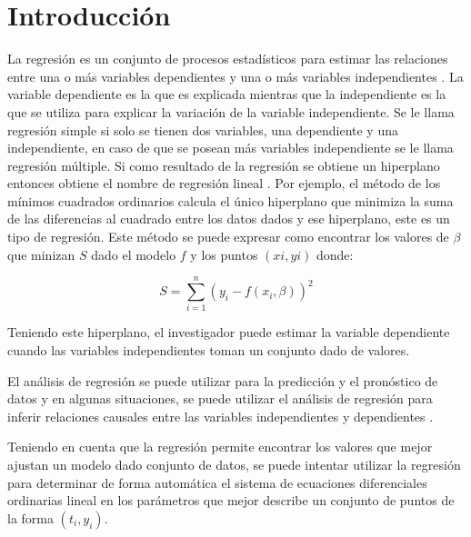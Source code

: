 \chapter*{Introducción}\label{chapter:introduction}

\qquad

La regresión es un conjunto de procesos estadísticos para estimar las relaciones entre una o más variables dependientes y una o más variables independientes \cite{johnson2015applied}. La variable dependiente es la que es explicada mientras que la independiente es la que se utiliza para explicar la variación de la variable independiente. Se le llama regresión simple si solo se tienen dos variables, una dependiente y una independiente, en caso de que se posean más variables independiente se le llama regresión múltiple. Si como resultado de la regresión se obtiene un hiperplano entonces obtiene el nombre de regresión lineal \cite{mann2007introductory}. Por ejemplo, el método de los mínimos cuadrados ordinarios calcula el único hiperplano que minimiza la suma de las diferencias al cuadrado entre los datos dados y ese hiperplano, este es un tipo de regresión. Este método se puede expresar como encontrar los valores de $\beta$ que minizan $S$ dado el modelo $f$ y los puntos $(xi, yi)$ donde:

$$S = \sum_{i=1}^{n}(y_i - f(x_i, \beta))^2$$

Teniendo este hiperplano, el investigador puede estimar la variable dependiente cuando las variables independientes toman un conjunto dado de valores.

El análisis de regresión se puede utilizar para la predicción y el pronóstico de datos y en algunas situaciones, se puede utilizar el análisis de regresión para inferir relaciones causales entre las variables independientes y dependientes \cite{mann2007introductory}.


Teniendo en cuenta que la regresión permite encontrar los valores que mejor ajustan un modelo dado conjunto de datos, se puede intentar utilizar la regresión para determinar de forma automática el sistema de ecuaciones diferenciales ordinarias lineal en los parámetros que mejor describe un conjunto de puntos de la forma $(t_i, y_i)$.

